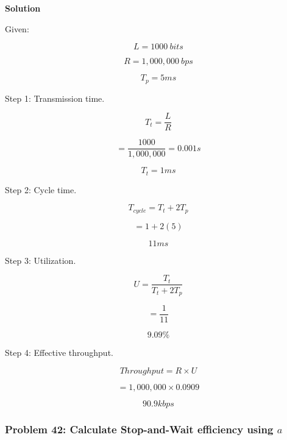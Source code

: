 \textbf{Solution}

Given:



\[
L=1000\ bits
\]





\[
R=1,000,000\ bps
\]





\[
T_p=5ms
\]



Step 1: Transmission time.



\[
T_t=\frac{L}{R}
\]





\[
=\frac{1000}{1,000,000} =0.001s
\]





\[
\boxed{T_t=1ms}
\]



Step 2: Cycle time.



\[
T_{cycle}=T_t+2T_p
\]





\[
=1+2(5)
\]





\[
\boxed{11ms}
\]



Step 3: Utilization.



\[
U=\frac{T_t}{T_t+2T_p}
\]





\[
=\frac{1}{11}
\]





\[
\boxed{9.09\%}
\]



Step 4: Effective throughput.



\[
Throughput=R\times U
\]





\[
=1,000,000\times0.0909
\]





\[
\boxed{90.9kbps}
\]



\subsubsection*{Problem 42: Calculate Stop-and-Wait efficiency using $a$}

